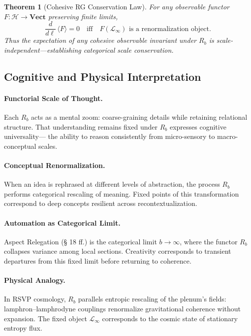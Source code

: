 \documentclass[12pt,a4paper,twoside,openright]{book}
\newtheorem{theorem}{Theorem}
\begin{document}
\begin{theorem}[Cohesive RG Conservation Law]
For any observable functor \(F:\mathcal{H}\!\to\!\mathbf{Vect}\)
preserving finite limits,
\[
\frac{d}{d\ell}\,
\langle F\rangle
 = 0
\quad\text{iff}\quad
F(\mathcal{L}_\infty)
 \text{ is a renormalization object.}
\]
Thus the expectation of any cohesive observable invariant under \(R_b\)
is scale-independent—establishing categorical scale conservation.
\end{theorem}

\subsection*{Cognitive and Physical Interpretation}

\paragraph{Functorial Scale of Thought.}
Each \(R_b\) acts as a mental zoom: coarse-graining details while retaining relational structure.
That understanding remains fixed under \(R_b\) expresses cognitive universality—
the ability to reason consistently from micro-sensory to macro-conceptual scales.

\paragraph{Conceptual Renormalization.}
When an idea is rephrased at different levels of abstraction,
the process \(R_b\) performs categorical rescaling of meaning.
Fixed points of this transformation correspond to deep concepts resilient across recontextualization.

\paragraph{Automation as Categorical Limit.}
Aspect Relegation (§ 18 ff.) is the categorical limit \(b\!\to\!\infty\),
where the functor \(R_b\) collapses variance among local sections.
Creativity corresponds to transient departures from this fixed limit before returning to coherence.

\paragraph{Physical Analogy.}
In RSVP cosmology, \(R_b\) parallels entropic rescaling of the plenum’s fields:
lamphron–lamphrodyne couplings renormalize gravitational coherence without expansion.
The fixed object \(\mathcal{L}_\infty\) corresponds to the cosmic state of stationary entropy flux.
\end{document}
